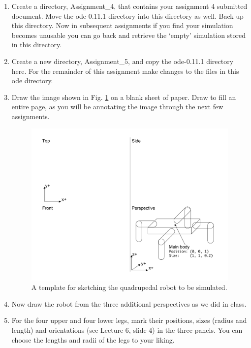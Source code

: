 \documentclass[12pt]{article}
\begin{document}
\begin{enumerate}

\item Create a directory, Assignment\_4, that contains your assignment 4 submitted document. Move the ode-0.11.1 directory into this directory as well. Back up this directory. Now in subsequent assignments if you find your simulation becomes unusable you can go back and retrieve the `empty' simulation stored in this directory.

\item Create a new directory, Assignment\_5, and copy the ode-0.11.1 directory here. For the remainder of this assignment make changes to the files in this ode directory.

\item Draw the image shown in Fig. \ref{Fig1} on a blank sheet of paper. Draw to fill an entire page, as you will be annotating the image through the next few assignments.

\begin{figure}[!t]
\centerline{
\includegraphics[width=1.0\textwidth]{Robot_Schematic}
}
\caption{A template for sketching the quadrupedal robot to be simulated.}
\label{Fig1}
\end{figure}

\item Now draw the robot from the three additional perspectives as we did in class.

\item For the four upper and four lower legs, mark their positions, sizes (radius and length) and orientations (see Lecture 6, slide 4) in the three panels. You can choose the lengths and radii of the legs to your liking.


\end{enumerate}
\end{document}
